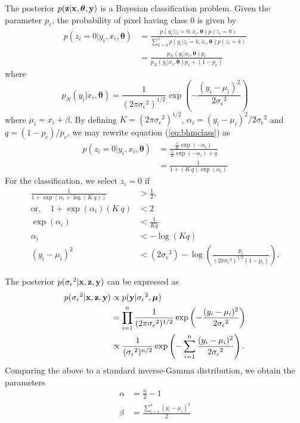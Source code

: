 \documentclass[a4paper,10pt]{article}
\def\bx{{\bf x}}
\def\by{{\bf y}}
\def\bz{{\bf z}}
\def\btheta{{\boldsymbol \theta}}
\def\bmu{{\boldsymbol \mu}}
\def\sigmaeps{{\sigma_{\epsilon}}}
\begin{document}
The posterior $p(\bz|\bx,\btheta,\by)$ is a Bayesian classification problem. Given the parameter $p_c$, the probability of pixel having class 0 is given by
\begin{align}
 p(z_i = 0| y_i, x_i, \btheta) &= \frac{p(y_i|z_i = 0, x_i, \btheta) p(z_i = 0)}{\sum_{k = 0}^1 p(y_i|z_i = k, x_i, \btheta) p(z_i = k)} \nonumber \\
 &= \frac{p_N(y_i|x_i,\btheta) p_c}{p_N(y_i|x_i,\btheta) p_c + (1-p_c)}
 \label{eq:bhmclass}
\end{align}
where
\begin{equation}
 p_N(y_i|x_i,\btheta) = \frac{1}{(2\pi \sigmaeps^2)^{1/2}} \exp\left( - \frac{(y_i - \mu_i)^2}{2\sigmaeps^2} \right)
\end{equation}
where $\mu_i = x_i + \beta$. By defining $K = (2\pi\sigmaeps^2)^{1/2}$, $\alpha_i = (y_i - \mu_i)^2/2\sigmaeps^2$ and $q = (1-p_c)/p_c$, we may rewrite equation (\ref{eq:bhmclass}) as
\begin{align}
 p(z_i = 0| y_i, x_i, \btheta) &= \frac{\frac{1}{K} \exp(-\alpha_i)}{\frac{1}{K}\exp(-\alpha_i) + q} \nonumber \\
                               &= \frac{1}{1 + (K~q) \exp(\alpha_i)}
\end{align}
For the classification, we select $z_i = 0$ if
\begin{align}
 \frac{1}{1 + \exp(\alpha_i + \log(K~q))} &> \frac{1}{2}, \nonumber \\
 \mathrm{or, }\quad 1 + \exp(\alpha_i) (K~q) &< 2 \nonumber \\
 \exp(\alpha_i) &< \frac{1}{Kq} \nonumber \\
 \alpha_i &< -\log(Kq) \nonumber \\
 (y_i - \mu_i)^2 &< (2\sigmaeps^2) - \log\left( \frac{p_c}{(2\pi \sigmaeps^2)^{1/2} (1-p_c)} \right).
 \label{eq:classification}
\end{align}

The posterior $p(\sigmaeps^2|\bx,\bz,\by)$ can be expressed as
\begin{align}
 p(\sigmaeps^2|\bx,\bz,\by) &\propto p(\by|\sigmaeps^2, \bmu) \nonumber \\
 &= \prod_{i=1}^n \frac{1}{(2\pi \sigmaeps^2)^{1/2}} \exp \left( -\frac{(y_i - \mu_i)^2}{2\sigmaeps^2} \right) \nonumber \\
 &\propto \frac{1}{(\sigmaeps^2)^{n/2}} \exp \left(- \sum_{i=1}^n \frac{(y_i - \mu_i)^2}{2\sigmaeps^2} \right).
\end{align}
Comparing the above to a standard inverse-Gamma distribution, we obtain the parameters
\begin{align}
 \alpha &= \frac{n}{2}-1 \nonumber \\
 \beta &= \frac{\sum_{i=1}^n(y_i - \mu_i)^2}{2}
\end{align}
\end{document}
